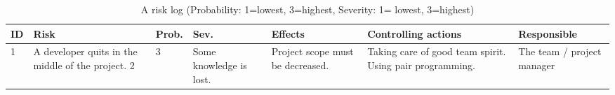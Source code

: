 \begin{table}[H]
\center
\begin{adjustwidth}{-2cm}{}
\begin{tabular}{|p{0.5cm}|p{3cm}|p{1cm}|p{1.5cm}|p{3cm}|p{3cm}|p{3cm}|} 
	
\hline %
\textbf{ID} & \textbf{Risk} & \textbf{Prob.} & \textbf{Sev.} & \textbf{Effects} 
& \textbf{Controlling actions} & \textbf{Responsible} \\ 
\hline
1 &
A developer quits in the middle of the project.
2 &
3 &
Some knowledge is lost. &
Project scope must be decreased. &
Taking care of good team spirit.
Using pair programming. &
The team / project manager \\
\hline
\end{tabular} 
\caption{A risk log (Probability: 1=lowest, 3=highest, Severity: 1= lowest, 
3=highest)}
\label{table:Risklog}
\end{adjustwidth}
\end{table}
